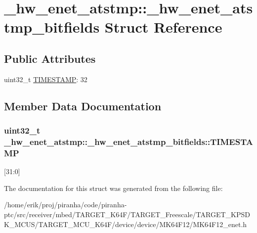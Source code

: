 \hypertarget{struct__hw__enet__atstmp_1_1__hw__enet__atstmp__bitfields}{}\section{\+\_\+hw\+\_\+enet\+\_\+atstmp\+:\+:\+\_\+hw\+\_\+enet\+\_\+atstmp\+\_\+bitfields Struct Reference}
\label{struct__hw__enet__atstmp_1_1__hw__enet__atstmp__bitfields}
\subsection*{Public Attributes}
\begin{DoxyCompactItemize}
\item 
uint32\+\_\+t \hyperlink{struct__hw__enet__atstmp_1_1__hw__enet__atstmp__bitfields_a49a759afbf623d334e53a5882e012ec7}{T\+I\+M\+E\+S\+T\+A\+MP}\+: 32
\end{DoxyCompactItemize}


\subsection{Member Data Documentation}
\subsubsection[{\texorpdfstring{T\+I\+M\+E\+S\+T\+A\+MP}{TIMESTAMP}}]{\setlength{\rightskip}{0pt plus 5cm}uint32\+\_\+t \+\_\+hw\+\_\+enet\+\_\+atstmp\+::\+\_\+hw\+\_\+enet\+\_\+atstmp\+\_\+bitfields\+::\+T\+I\+M\+E\+S\+T\+A\+MP}\hypertarget{struct__hw__enet__atstmp_1_1__hw__enet__atstmp__bitfields_a49a759afbf623d334e53a5882e012ec7}{}\label{struct__hw__enet__atstmp_1_1__hw__enet__atstmp__bitfields_a49a759afbf623d334e53a5882e012ec7}
\mbox{[}31\+:0\mbox{]} 

The documentation for this struct was generated from the following file\+:\begin{DoxyCompactItemize}
\item 
/home/erik/proj/piranha/code/piranha-\/ptc/src/receiver/mbed/\+T\+A\+R\+G\+E\+T\+\_\+\+K64\+F/\+T\+A\+R\+G\+E\+T\+\_\+\+Freescale/\+T\+A\+R\+G\+E\+T\+\_\+\+K\+P\+S\+D\+K\+\_\+\+M\+C\+U\+S/\+T\+A\+R\+G\+E\+T\+\_\+\+M\+C\+U\+\_\+\+K64\+F/device/device/\+M\+K64\+F12/M\+K64\+F12\+\_\+enet.\+h\end{DoxyCompactItemize}
